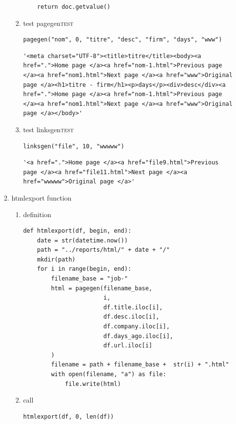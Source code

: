 \documentclass[11pt]{article}
\begin{document}
\begin{enumerate}
\begin{enumerate}
\begin{enumerate}
\begin{verbatim}
    return doc.getvalue()
\end{verbatim}

\item test pagegen\hfill{}\textsc{test}
\label{sec:org3e000a2}
\begin{verbatim}
pagegen("nom", 0, "titre", "desc", "firm", "days", "www")
\end{verbatim}

\begin{verbatim}
'<meta charset="UTF-8"><title>titre</title><body><a href=".">Home page </a><a href="nom-1.html">Previous page </a><a href="nom1.html">Next page </a><a href="www">Original page </a><h1>titre - firm</h1><p>days</p><div>desc</div><a href=".">Home page </a><a href="nom-1.html">Previous page </a><a href="nom1.html">Next page </a><a href="www">Original page </a></body>'
\end{verbatim}

\item test linksgen\hfill{}\textsc{test}
\label{sec:orgdacc6d7}
\begin{verbatim}
linksgen("file", 10, "wwwww")
\end{verbatim}

\begin{verbatim}
'<a href=".">Home page </a><a href="file9.html">Previous page </a><a href="file11.html">Next page </a><a href="wwwww">Original page </a>'
\end{verbatim}
\end{enumerate}
\item htmlexport function
\label{sec:orgdc31057}
\begin{enumerate}
\item definition
\label{sec:org8c6c126}
\begin{verbatim}
def htmlexport(df, begin, end):
    date = str(datetime.now())
    path = "../reports/html/" + date + "/"
    mkdir(path)
    for i in range(begin, end):
        filename_base = "job-"
        html = pagegen(filename_base,
                       i,
                       df.title.iloc[i],
                       df.desc.iloc[i],
                       df.company.iloc[i],
                       df.days_ago.iloc[i],
                       df.url.iloc[i]
        )
        filename = path + filename_base +  str(i) + ".html"
        with open(filename, "a") as file:
            file.write(html)

\end{verbatim}

\item call
\label{sec:orge3d21e9}
\begin{verbatim}
htmlexport(df, 0, len(df))
\end{verbatim}
\end{enumerate}
\end{enumerate}
\end{enumerate}
\end{document}
